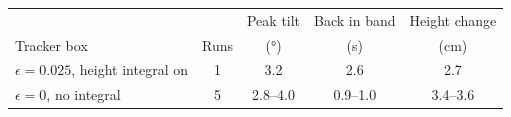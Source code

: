 \begin{tabularx}{\textwidth}{>{\raggedright\arraybackslash}Xcccc}
\toprule
 & & Peak tilt & Back in band & Height change \\
Tracker box & Runs & (\si{\degree}) & (s) & (cm) \\
\midrule
$\epsilon = 0.025$, height integral on & 1 & 3.2 & 2.6 & 2.7 \\
$\epsilon = 0$, no integral & 5 & 2.8--4.0 & 0.9--1.0 & 3.4--3.6 \\
\bottomrule
\end{tabularx}

